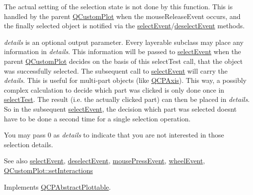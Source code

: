 The actual setting of the selection state is not done by this function. This is handled by the parent \hyperlink{class_q_custom_plot}{Q\+Custom\+Plot} when the mouse\+Release\+Event occurs, and the finally selected object is notified via the \hyperlink{class_q_c_p_abstract_plottable_a2d488568cf16600dd81fa23d7d439829}{select\+Event}/\hyperlink{class_q_c_p_abstract_plottable_a9b104d9da4f38f934363945c313bf82e}{deselect\+Event} methods.

{\itshape details} is an optional output parameter. Every layerable subclass may place any information in {\itshape details}. This information will be passed to \hyperlink{class_q_c_p_abstract_plottable_a2d488568cf16600dd81fa23d7d439829}{select\+Event} when the parent \hyperlink{class_q_custom_plot}{Q\+Custom\+Plot} decides on the basis of this select\+Test call, that the object was successfully selected. The subsequent call to \hyperlink{class_q_c_p_abstract_plottable_a2d488568cf16600dd81fa23d7d439829}{select\+Event} will carry the {\itshape details}. This is useful for multi-\/part objects (like \hyperlink{class_q_c_p_axis}{Q\+C\+P\+Axis}). This way, a possibly complex calculation to decide which part was clicked is only done once in \hyperlink{class_q_c_p_color_map_afb4b843596addf58096082827a9e3450}{select\+Test}. The result (i.\+e. the actually clicked part) can then be placed in {\itshape details}. So in the subsequent \hyperlink{class_q_c_p_abstract_plottable_a2d488568cf16600dd81fa23d7d439829}{select\+Event}, the decision which part was selected doesn\textquotesingle{}t have to be done a second time for a single selection operation.

You may pass 0 as {\itshape details} to indicate that you are not interested in those selection details.

\begin{DoxySeeAlso}{See also}
\hyperlink{class_q_c_p_abstract_plottable_a2d488568cf16600dd81fa23d7d439829}{select\+Event}, \hyperlink{class_q_c_p_abstract_plottable_a9b104d9da4f38f934363945c313bf82e}{deselect\+Event}, \hyperlink{class_q_c_p_layerable_af6567604818db90f4fd52822f8bc8376}{mouse\+Press\+Event}, \hyperlink{class_q_c_p_layerable_a47dfd7b8fd99c08ca54e09c362b6f022}{wheel\+Event}, \hyperlink{class_q_custom_plot_a5ee1e2f6ae27419deca53e75907c27e5}{Q\+Custom\+Plot\+::set\+Interactions} 
\end{DoxySeeAlso}


Implements \hyperlink{class_q_c_p_abstract_plottable_a38efe9641d972992a3d44204bc80ec1d}{Q\+C\+P\+Abstract\+Plottable}.

